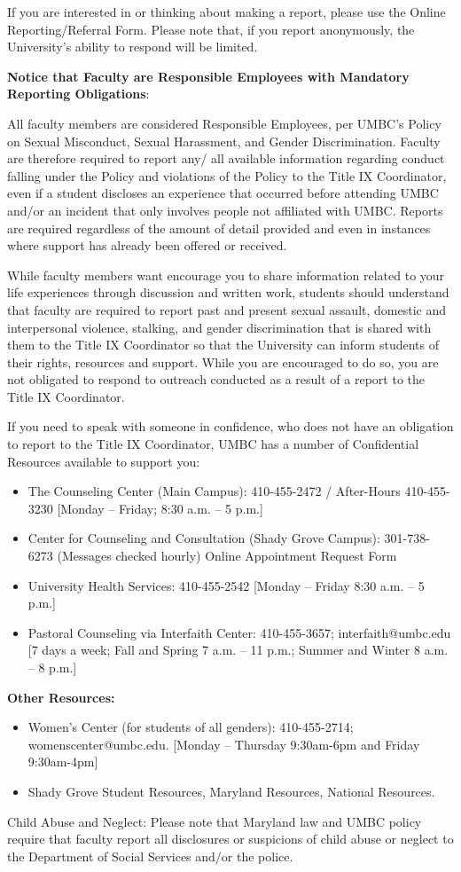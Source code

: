 \documentclass[11pt]{article}
\begin{document}
If you are interested in or thinking about making a report, please use the Online Reporting/Referral Form. Please note that, if you report anonymously,  the University’s ability to respond will be limited.

\textbf{Notice that Faculty are Responsible Employees with Mandatory Reporting Obligations}:

All faculty members are considered Responsible Employees, per UMBC’s Policy on Sexual Misconduct, Sexual Harassment, and Gender Discrimination. Faculty are therefore required to report any/ all available information regarding conduct falling under the Policy and violations of the Policy to the Title IX Coordinator, even if a student discloses an experience that occurred before attending UMBC and/or an incident that only involves people not affiliated with UMBC.  Reports are required regardless of the amount of detail provided and even in instances where support has already been offered or received.

While faculty members want encourage you to share information related to your life experiences through discussion and written work, students should understand that faculty are required to report past and present sexual assault, domestic and interpersonal violence, stalking, and gender discrimination that is shared with them to the Title IX Coordinator so that the University can inform students of their rights, resources and support.  While you are encouraged to do so, you are not obligated to respond to outreach conducted as a result of a report to the Title IX Coordinator.

If you need to speak with someone in confidence, who does not have an obligation to report to the Title IX Coordinator, UMBC has a number of Confidential Resources available to support you: 
\begin{itemize}
\item The Counseling Center (Main Campus): 410-455-2472 / After-Hours 410-455-3230 [Monday – Friday; 8:30 a.m. – 5 p.m.]
\item	Center for Counseling and Consultation (Shady Grove Campus): 301-738-6273 (Messages checked hourly)  Online Appointment Request Form
\item University Health Services: 410-455-2542 [Monday – Friday 8:30 a.m. – 5 p.m.]
\item Pastoral Counseling via Interfaith Center: 410-455-3657; interfaith@umbc.edu [7 days a week; Fall and Spring 7 a.m. – 11 p.m.; Summer and Winter 8 a.m. – 8 p.m.]
\end{itemize}
\textbf{Other Resources:}
\begin{itemize}
\item	Women’s Center (for students of all genders): 410-455-2714; womenscenter@umbc.edu. [Monday – Thursday 9:30am-6pm and Friday 9:30am-4pm]
\item  Shady Grove Student Resources, Maryland Resources, National Resources.
\end{itemize}
Child Abuse and Neglect:
Please note that Maryland law and UMBC policy require that faculty report all disclosures or suspicions of child abuse or neglect to the Department of Social Services and/or the police.
\end{document}
